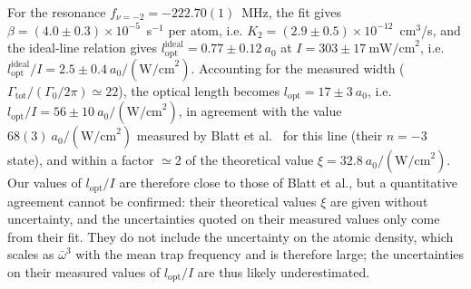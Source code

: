 For the resonance $f_{\nu=-2}=-222.70(1)$~MHz, the fit gives
$\beta=(4.0\pm0.3)\times10^{-5}$~s$^{-1}$ per atom, i.e.
$K_2=(2.9\pm0.5)\times10^{-12}$~cm$^3$/s, and the ideal-line relation gives
$l_{\text{opt}}^{\text{ideal}} = 0.77\pm0.12~a_0$ at $I = 303\pm17~\text{mW/cm}^2$, i.e.
$l_{\text{opt}}^{\text{ideal}}/I = 2.5\pm0.4~a_0/(\text{W/cm}^2)$. Accounting for the
measured width ($\Gamma_{\text{tot}}/(\Gamma_0/2\pi) \simeq 22$), the optical length becomes
$l_{\text{opt}} = 17\pm3~a_0$, i.e. $l_{\text{opt}}/I = 56\pm10~a_0/(\text{W/cm}^2)$, in
agreement with the value $68(3)~a_0/(\text{W/cm}^2)$ measured by Blatt et
al.~\cite{blatt_systematic_2011} for this line (their $n=-3$ state), and within a factor
$\simeq2$ of the theoretical value $\xi = 32.8~a_0/(\text{W/cm}^2)$.
Our values of $l_{\text{opt}}/I$ are therefore close to those of Blatt et al., but a
quantitative agreement cannot be confirmed: their theoretical values $\xi$ are given without
uncertainty, and the uncertainties quoted on their measured values only come from their fit.
They do not include the uncertainty on the atomic density, which scales as $\bar\omega^3$
with the mean trap frequency and is therefore large; the uncertainties on their measured
values of $l_{\text{opt}}/I$ are thus likely underestimated.



